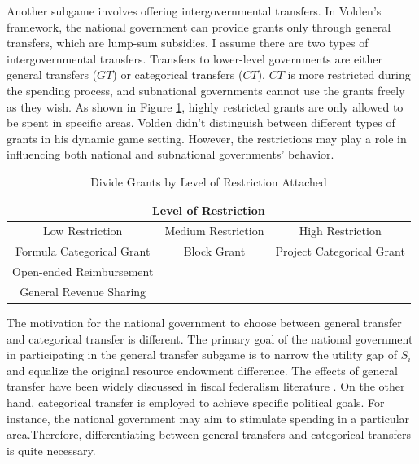 \documentclass[man]{apa7}
\begin{document}
Another subgame involves offering intergovernmental transfers. In Volden's framework, the national government can provide grants only through general transfers, which are lump-sum subsidies. I assume there are two types of intergovernmental transfers. Transfers to lower-level governments are either general transfers ($GT$) or categorical transfers ($CT$). $CT$ is more restricted during the spending process, and subnational governments cannot use the grants freely as they wish. As shown in Figure \ref{Table 1.3}, highly restricted grants are only allowed to be spent in specific areas. Volden didn't distinguish between different types of grants in his dynamic game setting. However, the restrictions may play a role in influencing both national and subnational governments' behavior.

\begin{table}[H]
  \centering
  \caption{Divide Grants by Level of Restriction Attached}
  \begin{tabular}{ccc}
    \toprule
    \multicolumn{3}{c}{Level of Restriction}                                   \\
    \midrule
    Low Restriction           & Medium Restriction & High Restriction          \\
    \midrule
    Formula Categorical Grant & Block Grant        & Project Categorical Grant \\
    Open-ended Reimbursement  &                    &                           \\
    General Revenue Sharing   &                    &                           \\
    \bottomrule
  \end{tabular}%
  \label{Table 1.3}%
\end{table}%

The motivation for the national government to choose between general transfer and categorical transfer is different. The primary goal of the national government in participating in the general transfer subgame is to narrow the utility gap of $S_i$ and equalize the original resource endowment difference. The effects of general transfer have been widely discussed in fiscal federalism literature \parencite{buettner2006incentive,lv2018transfer}. On the other hand, categorical transfer is employed to achieve specific political goals. For instance, the national government may aim to stimulate spending in a particular area.Therefore, differentiating between general transfers and categorical transfers is quite necessary.
\end{document}
